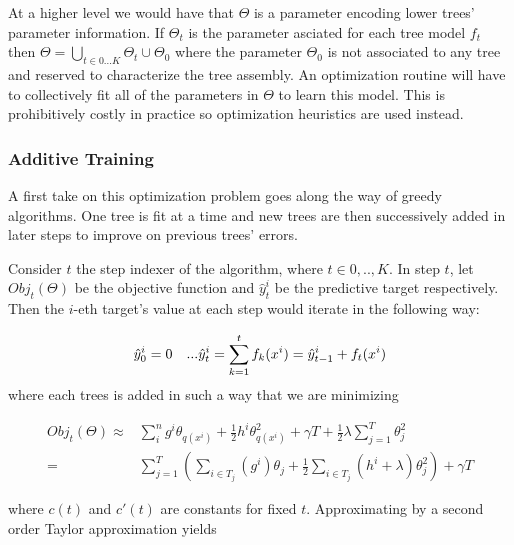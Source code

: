 \documentclass{article}%
\theoremstyle{definition}
\begin{document}
At a higher level we would have that $\Theta$ is a parameter encoding lower trees' parameter information. If $\Theta_t$ is the parameter asciated for each tree model $f_t$ then $\Theta =  \bigcup_{t \in {0...K}} \Theta_t  \cup \Theta_0$ where the parameter $\Theta_0$ is not associated to any tree and reserved to characterize the tree assembly. An optimization routine will have to collectively fit all of the parameters in $\Theta$ to learn this model. This is prohibitively costly in practice so optimization heuristics are used instead. 

\subsubsection{Additive Training}

A first take on this optimization problem goes along the way of greedy algorithms. One tree is fit at a time and new trees are then successively added in later steps to improve on previous trees' errors.

Consider $t$ the step indexer of the algorithm, where $t \in {0,..,K}$. In step $t$, let $Obj_t(\Theta)$ be the objective function and $\hat{y}_t^i$ be the predictive target respectively. Then the $i$-eth target's value at each step would iterate in the following way:

\begin{equation} \label{eq:gb-targetSteps}
\hat{y}_0^i = 0 \\
\ \ \ ... \\ 
\hat{y}_t^i = \sum_{k=1}^{t} f_k(x^i) = \hat{y}_{t-1}^i +  f_t(x^i)
\end{equation}
where each trees is added in such a way that we are minimizing

\[
\begin{split}
Obj_t(\Theta) \approx &  \sum_i^n {g^i \theta_{q(x^i)} + \frac{1}{2} h^i \theta_{q(x^i)}^2 } + \gamma T + \frac{1}{2}\lambda \sum_{j=1}^T\theta_j^2 \\
=  & \sum_{j=1}^T\left(  \sum_{i \in T_j} (g^i )\theta_{j} + \frac{1}{2} \sum_{i \in T_j} (h^i + \lambda ) \theta_{j}^2  \right) + \gamma T
\end{split}
\]

where $c(t)$ and $c'(t)$ are constants for fixed $t$. Approximating by a second order Taylor approximation yields
\end{document}
